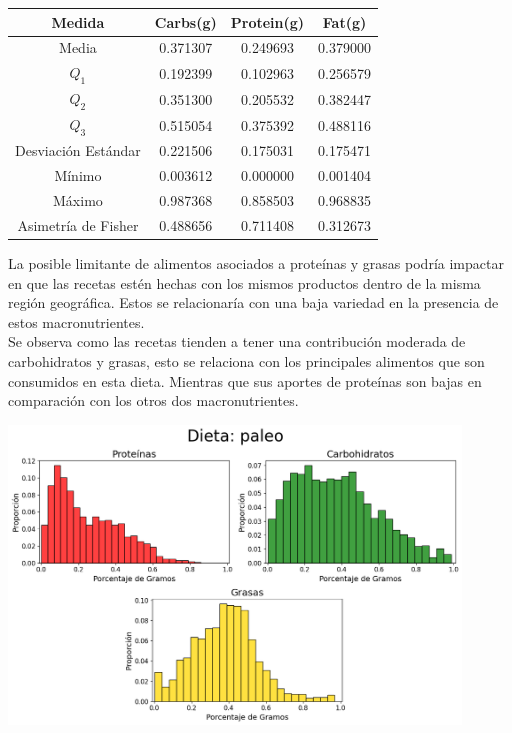 \documentclass[12pt,a4paper]{article}
\begin{document}
            \begin{center}
                \begin{tabular}{| c | c c c |}
                    \toprule
                    Medida & Carbs(g) & Protein(g) & Fat(g) \\
                    \midrule
                    Media               & 0.371307 & 0.249693 & 0.379000  \\
                    $Q_1$               & 0.192399 & 0.102963 & 0.256579  \\
                    $Q_2$               & 0.351300 & 0.205532 & 0.382447  \\
                    $Q_3$               & 0.515054 & 0.375392 & 0.488116  \\
                    Desviación Estándar & 0.221506 & 0.175031 & 0.175471  \\
                    Mínimo              & 0.003612 & 0.000000 & 0.001404  \\
                    Máximo              & 0.987368 & 0.858503 & 0.968835  \\
                    Asimetría de Fisher & 0.488656 & 0.711408 & 0.312673  \\
                    \bottomrule
                \end{tabular}
            \end{center}

            La posible limitante de alimentos asociados a proteínas	y grasas 
            podría impactar en que las recetas estén hechas con los mismos productos 
            dentro de la misma región geográfica. Estos se relacionaría con una 
            baja variedad en la presencia de estos macronutrientes.\\

            Se observa como las recetas tienden a tener una contribución moderada de 
            carbohidratos y grasas, esto se relaciona con los principales alimentos 
            que son consumidos en esta dieta. Mientras que sus aportes de proteínas 
            son bajas en comparación con los otros dos macronutrientes.
            
            \begin{center}
                \includegraphics[width=0.90\textwidth]{Resources/2_03_plot_04.png}
            \end{center}
\end{document}
